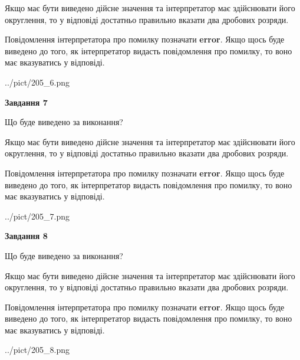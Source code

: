 \documentclass[12pt, ukrainian]{article}
\begin{document}
{\begin {Large}
Якщо має бути виведено дійсне значення та інтерпретатор має здійснювати його округлення, 
то у відповіді достатньо правильно вказати два дробових розряди.

Повідомлення інтерпретатора про помилку позначати \textbf{error}.
Якщо щось буде виведено до того, як інтерпретатор видасть повідомлення про помилку, 
то воно має вказуватись у відповіді. \par

\begin{center}
	{../pict/205_6.png}
\end{center}
\newpage

{\begin {center}\textbf{Завдання 7}\end {center}}\par
Що буде виведено за виконання? \par

Якщо має бути виведено дійсне значення та інтерпретатор має здійснювати його округлення, 
то у відповіді достатньо правильно вказати два дробових розряди.

Повідомлення інтерпретатора про помилку позначати \textbf{error}.
Якщо щось буде виведено до того, як інтерпретатор видасть повідомлення про помилку, 
то воно має вказуватись у відповіді. \par

\begin{center}
	{../pict/205_7.png}
\end{center}
\newpage

{\begin {center}\textbf{Завдання 8}\end {center}}\par
Що буде виведено за виконання? \par

Якщо має бути виведено дійсне значення та інтерпретатор має здійснювати його округлення, 
то у відповіді достатньо правильно вказати два дробових розряди.

Повідомлення інтерпретатора про помилку позначати \textbf{error}.
Якщо щось буде виведено до того, як інтерпретатор видасть повідомлення про помилку, 
то воно має вказуватись у відповіді. \par

\begin{center}
	{../pict/205_8.png}
\end{center}
\newpage


\end{Large}}
\end{document}
